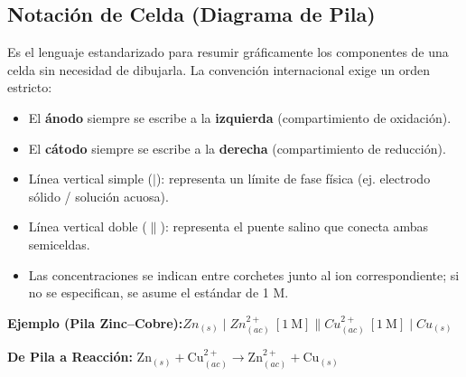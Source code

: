 \documentclass[letterpaper, 12pt, twoside]{article}
\begin{document}
\newpage
\thispagestyle{fancy}
\vspace*{0.2cm}
\begingroup\small

\subsection*{Notación de Celda (Diagrama de Pila)}
\thispagestyle{fancy}
Es el lenguaje estandarizado para resumir gráficamente los componentes de una celda sin necesidad de dibujarla. La convención internacional exige un orden estricto:
\begin{itemize}[leftmargin=15pt, topsep=2pt, itemsep=2pt]
    \item El \textbf{ánodo} siempre se escribe a la \textbf{izquierda} (compartimiento de oxidación).
    \item El \textbf{cátodo} siempre se escribe a la \textbf{derecha} (compartimiento de reducción).
    \item Línea vertical simple ($|$): representa un límite de fase física (ej. electrodo sólido / solución acuosa).
    \item Línea vertical doble ($\parallel$): representa el puente salino que conecta ambas semiceldas.
    \item Las concentraciones se indican entre corchetes junto al ion correspondiente; si no se especifican, se asume el estándar de 1 M.
\end{itemize}

\vspace{0.2cm}
\begin{center}
    \textbf{Ejemplo (Pila Zinc–Cobre):}\quad $Zn_{(s)} \mid Zn^{2+}_{(ac)}\ [1\ \text{M}] \parallel Cu^{2+}_{(ac)}\ [1\ \text{M}] \mid Cu_{(s)}$
\end{center}
\begin{center}
   \textbf{De Pila a Reacción:} \quad $\mathrm{Zn}_{(s)} + \mathrm{Cu}^{2+}_{(ac)} \rightarrow \mathrm{Zn}^{2+}_{(ac)} + \mathrm{Cu}_{(s)}$
\end{center}
\vspace{0.1cm}
\end{document}

